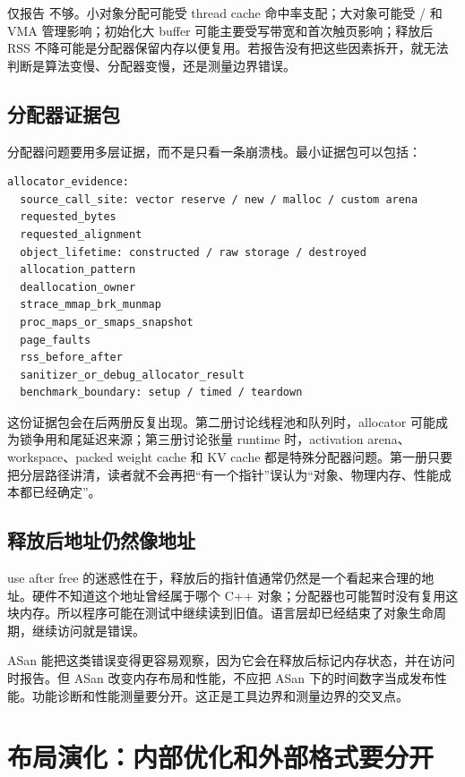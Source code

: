 仅报告  不够。小对象分配可能受 thread cache 命中率支配；大对象可能受 / 和 VMA 管理影响；初始化大 buffer 可能主要受写带宽和首次触页影响；释放后 RSS 不降可能是分配器保留内存以便复用。若报告没有把这些因素拆开，就无法判断是算法变慢、分配器变慢，还是测量边界错误。

\subsection{分配器证据包}

分配器问题要用多层证据，而不是只看一条崩溃栈。最小证据包可以包括：

\begin{lstlisting}[numbers=none,caption={分配器证据包}]
allocator_evidence:
  source_call_site: vector reserve / new / malloc / custom arena
  requested_bytes
  requested_alignment
  object_lifetime: constructed / raw storage / destroyed
  allocation_pattern
  deallocation_owner
  strace_mmap_brk_munmap
  proc_maps_or_smaps_snapshot
  page_faults
  rss_before_after
  sanitizer_or_debug_allocator_result
  benchmark_boundary: setup / timed / teardown
\end{lstlisting}

这份证据包会在后两册反复出现。第二册讨论线程池和队列时，allocator 可能成为锁争用和尾延迟来源；第三册讨论张量 runtime 时，activation arena、workspace、packed weight cache 和 KV cache 都是特殊分配器问题。第一册只要把分层路径讲清，读者就不会再把“有一个指针”误认为“对象、物理内存、性能成本都已经确定”。

\subsection{释放后地址仍然像地址}

use after free 的迷惑性在于，释放后的指针值通常仍然是一个看起来合理的地址。硬件不知道这个地址曾经属于哪个 C++ 对象；分配器也可能暂时没有复用这块内存。所以程序可能在测试中继续读到旧值。语言层却已经结束了对象生命周期，继续访问就是错误。

ASan 能把这类错误变得更容易观察，因为它会在释放后标记内存状态，并在访问时报告。但 ASan 改变内存布局和性能，不应把 ASan 下的时间数字当成发布性能。功能诊断和性能测量要分开。这正是工具边界和测量边界的交叉点。

\section{布局演化：内部优化和外部格式要分开}

